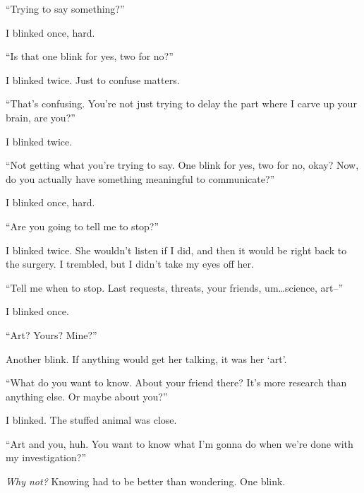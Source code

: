 ``Trying to say something?''



I blinked once, hard.



``Is that one blink for yes, two for no?''



I blinked twice.  Just to confuse matters.



``That's confusing.  You're not just trying to delay the part where I carve up your brain, are you?''



I blinked twice.



``Not getting what you're trying to say.  One blink for yes, two for no, okay?  Now, do you actually have something meaningful to communicate?''



I blinked once, hard.



``Are you going to tell me to stop?''



I blinked twice.  She wouldn't listen if I did, and then it would be right back to the surgery.  I trembled, but I didn't take my eyes off her.



``Tell me when to stop.  Last requests, threats, your friends, um\ldots science, art--''



I blinked once.



``Art?  Yours?  Mine?''



Another blink.  If anything would get her talking, it was her `art'.



``What do you want to know.  About your friend there?  It's more research than anything else.  Or maybe about you?''



I blinked.  The stuffed animal was close.



``Art and you, huh.  You want to know what I'm gonna do when we're done with my investigation?''



\emph{Why not?}  Knowing had to be better than wondering.  One blink.



